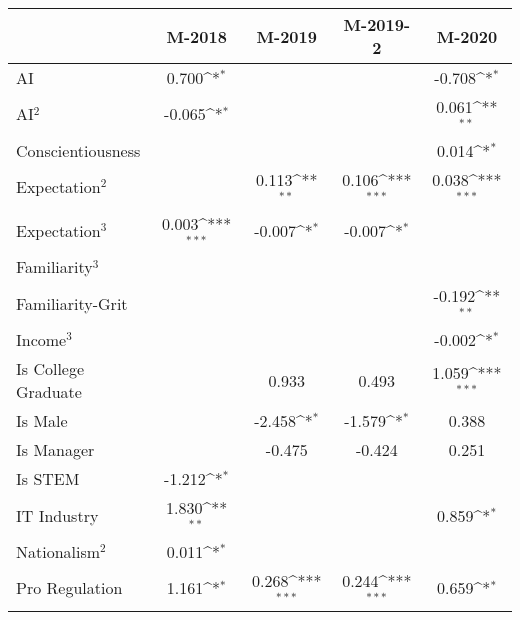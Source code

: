 {
\def\sym#1{\ifmmode^{#1}\else\(^{#1}\)\fi}
\begin{tabular}{l*{4}{c}}
    \toprule
                        & M-2018         & M-2019         & M-2019-2       & M-2020                \\
    \midrule
    AI                  & 0.700\sym{*}   &                &                & -0.708\sym{*}         \\
    \addlinespace
    AI$^2$              & -0.065\sym{*}  &                &                & 0.061\sym{**}         \\
    \addlinespace
    Conscientiousness   &                &                &                & 0.014\sym{*}          \\
    \addlinespace
    Expectation$^2$     &                & 0.113\sym{**}  & 0.106\sym{***} & 0.038\sym{***}        \\
    \addlinespace
    Expectation$^3$     & 0.003\sym{***} & -0.007\sym{*}  & -0.007\sym{*}  &                       \\
    \addlinespace
    Familiarity$^3$     &                &                &                &                       \\
    \addlinespace
    Familiarity-Grit    &                &                &                & -0.192\sym{**}        \\
    \addlinespace
    Income$^3$          &                &                &                & -0.002\sym{*}         \\
    \addlinespace
    Is College Graduate &                & 0.933          & 0.493          & 1.059\sym{***}        \\
    \addlinespace
    Is Male             &                & -2.458\sym{*}  & -1.579\sym{*}  & 0.388                 \\
    \addlinespace
    Is Manager          &                & -0.475         & -0.424         & 0.251                 \\
    \addlinespace
    Is STEM             & -1.212\sym{*}  &                &                &                       \\
    \addlinespace
    IT Industry         & 1.830\sym{**}  &                &                & 0.859\sym{*}          \\
    \addlinespace
    Nationalism$^2$     & 0.011\sym{*}   &                &                &                       \\
    \addlinespace
    Pro Regulation      & 1.161\sym{*}   & 0.268\sym{***} & 0.244\sym{***} & 0.659\sym{*}          \\

\end{tabular}}
